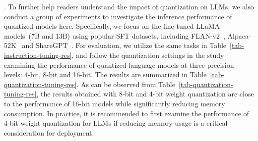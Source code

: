 . 
To further help readers  understand the  impact of quantization on LLMs, we also conduct  a group of experiments to investigate the inference performance of quantized models here. 
Specifically, we focus on the fine-tuned LLaMA models~(\ie 7B and 13B) using popular SFT datasets, including FLAN-v2~\cite{Chung-arxiv-2022-Scaling}, Alpaca-52K~\cite{alpaca} and ShareGPT~\cite{ShareGPT}.
For evaluation, we utilize the same tasks  in Table~\ref{tab-instruction-tuning-res}, and  follow the quantization settings in the study~\cite{Liu-2023-arxiv-Do_emergent} examining the performance of quantized language models at three precision levels: 4-bit, 8-bit and 16-bit. The results are summarized in Table~\ref{tab-quantization-tuning-res}.
As can be observed from Table~\ref{tab-quantization-tuning-res}, the results obtained with 8-bit and 4-bit weight quantization are close to the performance of 16-bit models while significantly reducing memory consumption. 
In practice, it is recommended to first examine the performance of 4-bit weight quantization for LLMs if reducing memory usage is a critical consideration for deployment.

